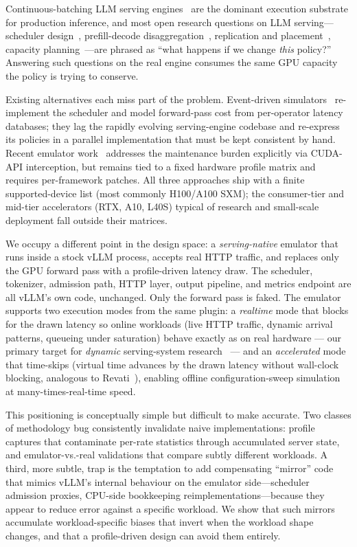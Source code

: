 \documentclass[conference]{IEEEtran}
\begin{document}
Continuous-batching LLM serving engines~\cite{kwon2023vllm,yu2022orca}
are the dominant execution substrate for production inference, and
most open research questions on LLM serving---scheduler
design~\cite{agrawal2024sarathi}, prefill-decode
disaggregation~\cite{zhong2024distserve,patel2024splitwise},
replication and placement~\cite{li2023alpaserve,sun2024llumnix},
capacity planning~\cite{patel2024polca}---are phrased as ``what
happens if we change \textit{this} policy?'' Answering such questions
on the real engine consumes the same GPU capacity the policy is
trying to conserve.

Existing alternatives each miss part of the problem. Event-driven
simulators~\cite{agrawal2024vidur,cho2024llmservingsim,
nvidia2026aiconfigurator} re-implement the scheduler and model
forward-pass cost from per-operator latency databases; they lag the
rapidly evolving serving-engine codebase and re-express its policies
in a parallel implementation that must be kept consistent by hand.
Recent emulator work~\cite{agrawal2026revati} addresses the
maintenance burden explicitly via CUDA-API interception, but remains
tied to a fixed hardware profile matrix and requires per-framework
patches. All three approaches ship with a finite supported-device
list (most commonly H100/A100 SXM); the consumer-tier and mid-tier
accelerators (RTX, A10, L40S) typical of research and small-scale
deployment fall outside their matrices.

We occupy a different point in the design space: a
\emph{serving-native} emulator that runs inside a stock vLLM process,
accepts real HTTP traffic, and replaces only the GPU forward pass
with a profile-driven latency draw. The scheduler, tokenizer,
admission path, HTTP layer, output pipeline, and metrics endpoint
are all vLLM's own code, unchanged. Only the forward pass is faked.
The emulator supports two execution modes from the same plugin: a
\emph{realtime} mode that blocks for the drawn latency so online
workloads (live HTTP traffic, dynamic arrival patterns, queueing
under saturation) behave exactly as on real hardware --- our
primary target for \emph{dynamic} serving-system
research~\cite{sun2024llumnix,patel2024polca} --- and an
\emph{accelerated} mode that time-skips (virtual time advances
by the drawn latency without wall-clock blocking, analogous to
Revati~\cite{agrawal2026revati}), enabling offline
configuration-sweep simulation at many-times-real-time speed.

This positioning is conceptually simple but difficult to make
accurate. Two classes of methodology bug consistently invalidate
naive implementations: profile captures that contaminate per-rate
statistics through accumulated server state, and emulator-vs.-real
validations that compare subtly different workloads. A third, more
subtle, trap is the temptation to add compensating ``mirror'' code
that mimics vLLM's internal behaviour on the emulator side---scheduler
admission proxies, CPU-side bookkeeping reimplementations---because
they appear to reduce error against a specific workload. We show that
such mirrors accumulate workload-specific biases that invert when the
workload shape changes, and that a profile-driven design can avoid
them entirely.
\end{document}
